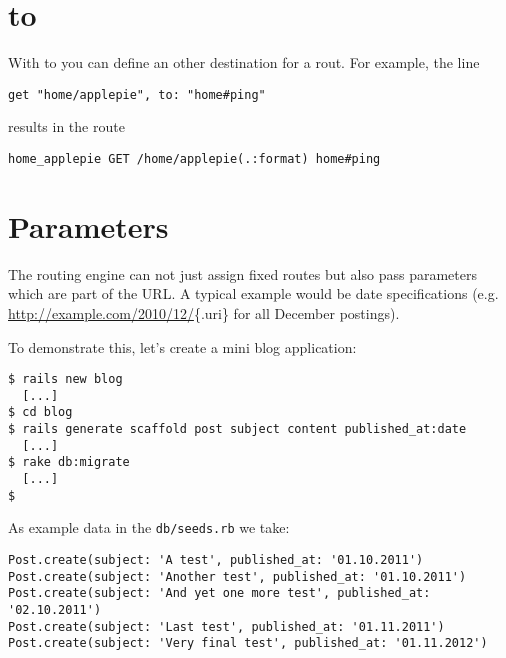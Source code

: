 \documentclass[a4paper]{book}
\begin{document}
\section{to}\label{to}

With to you can define an other destination for a rout. For example, the line

\begin{shaded}\begin{verbatim}
get "home/applepie", to: "home#ping"
\end{verbatim}\end{shaded}

results in the route

\begin{shaded}\begin{verbatim}
home_applepie GET /home/applepie(.:format) home#ping
\end{verbatim}\end{shaded}

\section{Parameters}\label{parameters}

The routing engine can not just assign fixed routes but also pass parameters which are part of the URL. A typical example would be date specifications (e.g. \url{http://example.com/2010/12/}\{.uri\} for all December postings).

To demonstrate this, let's create a mini blog application:

\begin{shaded}\begin{verbatim}
$ rails new blog
  [...]
$ cd blog
$ rails generate scaffold post subject content published_at:date
  [...]
$ rake db:migrate
  [...]
$
\end{verbatim}\end{shaded}

As example data in the \texttt{db/seeds.rb} we take:

\begin{shaded}\begin{verbatim}
Post.create(subject: 'A test', published_at: '01.10.2011')
Post.create(subject: 'Another test', published_at: '01.10.2011')
Post.create(subject: 'And yet one more test', published_at: '02.10.2011')
Post.create(subject: 'Last test', published_at: '01.11.2011')
Post.create(subject: 'Very final test', published_at: '01.11.2012')
\end{verbatim}\end{shaded}
\end{document}

